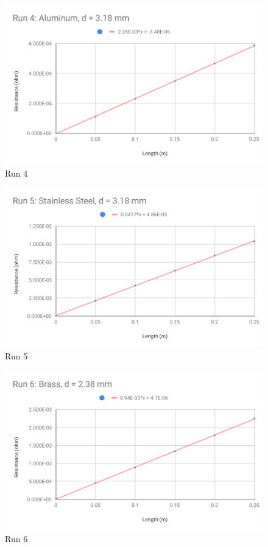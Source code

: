 %
\begin{figure}[ht]
	\centering
	\includegraphics[scale=0.74]{image/02-resistance/run4.pdf}
	\caption{Run 4}
	\label{figure.02.run.4}
\end{figure}
%
\begin{figure}[ht]
	\centering
	\includegraphics[scale=0.74]{image/02-resistance/run5.pdf}
	\caption{Run 5}
	\label{figure.02.run.5}
\end{figure}
%
\begin{figure}[ht]
	\centering
	\includegraphics[scale=0.74]{image/02-resistance/run6.pdf}
	\caption{Run 6}
	\label{figure.02.run.6}
\end{figure}
